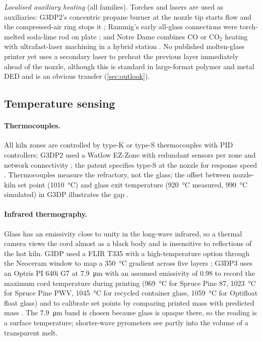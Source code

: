 \emph{Localised auxiliary heating} (all families). Torches and lasers are used as auxiliaries: G3DP2's concentric propane burner at the nozzle tip starts flow and the compressed-air ring stops it \citep{inamura2018}; Rammig's early all-glass connections were torch-melted soda-lime rod on plate \citep{rammig2012,seel2018}; and Notre Dame combines CO or CO$_2$ heating with ultrafast-laser machining in a hybrid station \citep{notredame_dgf}. No published molten-glass printer yet uses a secondary laser to preheat the previous layer immediately ahead of the nozzle, although this is standard in large-format polymer and metal DED and is an obvious transfer (\cref{sec:outlook}).

\subsection{Temperature sensing}
\paragraph{Thermocouples.} All kiln zones are controlled by type-K or type-S thermocouples with PID controllers; G3DP2 used a Watlow EZ-Zone with redundant sensors per zone and network connectivity \citep{inamura2018}; the patent specifies type-S at the nozzle for response speed \citep{patent_us9919510,klein2015}. Thermocouples measure the refractory, not the glass; the offset between nozzle-kiln set point (\SI{1010}{\celsius}) and glass exit temperature (\SI{920}{\celsius} measured, \SI{990}{\celsius} simulated) in G3DP illustrates the gap \citep{klein2015}.

\paragraph{Infrared thermography.} Glass has an emissivity close to unity in the long-wave infrared, so a thermal camera views the cord almost as a black body and is insensitive to reflections of the hot kiln. G3DP used a FLIR T335 with a high-temperature option through the Neoceram window to map a \SI{350}{\celsius} gradient across five layers \citep{klein2015}; G3DP3 uses an Optris PI 640i G7 at \SI{7.9}{\micro\metre} with an assumed emissivity of 0.98 to record the maximum cord temperature during printing (\SI{969}{\celsius} for Spruce Pine 87, \SI{1023}{\celsius} for Spruce Pine PWV, \SI{1045}{\celsius} for recycled container glass, \SI{1059}{\celsius} for Optifloat float glass) and to calibrate set points by comparing printed mass with predicted mass \citep{stern2024cgc}. The \SI{7.9}{\micro\metre} band is chosen because glass is opaque there, so the reading is a surface temperature; shorter-wave pyrometers see partly into the volume of a transparent melt.

